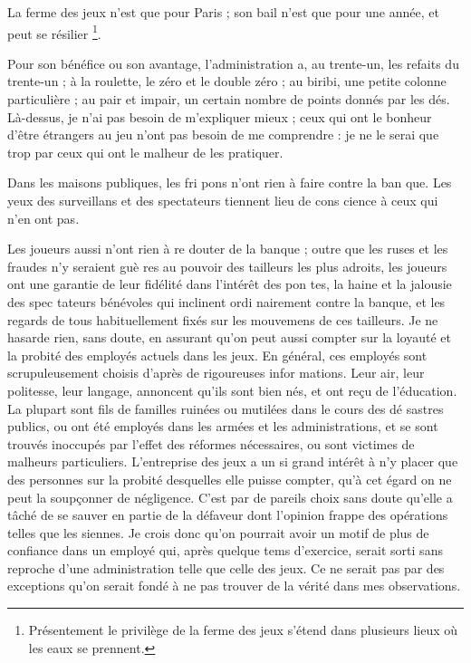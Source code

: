 La ferme des jeux n'est que pour
Paris ; son bail n'est que pour une
année, et peut se résilier
\footnote{
  Présentement le privilège de la ferme des jeux
  s'étend dans plusieurs lieux où les eaux se prennent.
}.

Pour son bénéfice ou son avantage,
l'administration a, au trente-un, les 
refaits du trente-un ; à la roulette, le
zéro et le double zéro ; au biribi, une
petite colonne particulière ; au pair
et impair, un certain nombre de
points donnés par les dés. Là-dessus,
je n'ai pas besoin de m'expliquer
mieux ; ceux qui ont le bonheur d'être
étrangers au jeu n'ont pas besoin de
me comprendre : je ne le serai que
trop par ceux qui ont le malheur de
les pratiquer.

Dans les maisons publiques, les fri%
pons n'ont rien à faire contre la ban%
que. Les yeux des surveillans et des
spectateurs tiennent lieu de cons%
cience à ceux qui n'en ont pas.

Les joueurs aussi n'ont rien à re%
douter de la banque ; outre que les
ruses et les fraudes n'y seraient guè%
res au pouvoir des tailleurs les plus
adroits, les joueurs ont une garantie
de leur fidélité dans l'intérêt des pon%
tes, la haine et la jalousie des spec%
tateurs bénévoles qui inclinent ordi%
nairement contre la banque, et les
regards de tous habituellement fixés
sur les mouvemens de ces tailleurs.
Je ne hasarde rien, sans doute, en
assurant qu'on peut aussi compter sur
la loyauté et la probité des employés
actuels dans les jeux. En général,
ces employés sont scrupuleusement
choisis d'après de rigoureuses infor%
mations. Leur air, leur politesse, leur
langage, annoncent qu'ils sont bien
nés, et ont reçu de l'éducation. La
plupart sont fils de familles ruinées
ou mutilées dans le cours des dé%
sastres publics, ou ont été employés 
dans les armées et les administrations,
et se sont trouvés inoccupés par l'effet
des réformes nécessaires, ou sont
victimes de malheurs particuliers.
L'entreprise des jeux a un si grand
intérêt à n'y placer que des personnes
sur la probité desquelles elle puisse
compter, qu'à cet égard on ne peut
la soupçonner de négligence. C'est
par de pareils choix sans doute qu'elle
a tâché de se sauver en partie de la
défaveur dont l'opinion frappe des
opérations telles que les siennes. Je
crois donc qu'on pourrait avoir un
motif de plus de confiance dans un
employé qui, après quelque tems
d'exercice, serait sorti sans reproche
d'une administration telle que celle
des jeux. Ce ne serait pas par des
exceptions qu'on serait fondé à ne
pas trouver de la vérité dans mes
observations.


